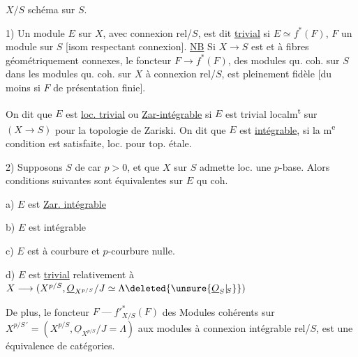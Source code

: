 $X/S$ \quad schéma sur $S$.

1) Un module  $E$ sur $X$, avec connexion rel/$S$, est dit  \uline{trivial} si $E\simeq f^\ast(F)$, $F$ un module  sur $S$ [isom respectant connexion].  \uline{NB} Si $X\longrightarrow S$ est   et à fibres géométriquement connexes,  le foncteur $F\longrightarrow f^\ast(F)$, des modules qu. coh. sur $S$ dans les modules qu. coh. sur $X$ à connexion rel/$S$, est pleinement fidèle [du moins si $F$ de présentation finie].

On dit que $E$ est \uline{loc. trivial} ou \uline{Zar-intégrable} si $E$ est trivial localm\textsuperscript{t} sur $(X\longrightarrow S)$ pour la topologie de Zariski. On dit que $E$ est \uline{intégrable}, si la m\textsuperscript{e} condition est satisfaite, loc. pour top. étale.

2) Supposons $S$ de car $p>0$, et que $X$ sur $S$ admette loc. une $p$-base. Alors  conditions suivantes sont équivalentes sur $E$ qu coh.

a) $E$ est \uline{Zar. intégrable}

b) $E$ est intégrable

c) $E$ est à courbure et $p$-courbure nulle.

d) $E$ est \uline{trivial} relativement à $X\longrightarrow(X^{p/S},\underline O_{X^{p/S}}/J\simeq\Lambda\deleted{\unsure{\underline O_S|{}_{\!S}}})$

De plus, le foncteur $F\mathrel{\text{---}}{f'}_{X/S}^\ast(F)$ des Modules cohérents sur $X^{p/S\,\prime}=(X^{p/S},\underline O_{X^{p/S}}/J=\Lambda)$ aux modules  à connexion intégrable rel/$S$, est une équivalence de catégories.
